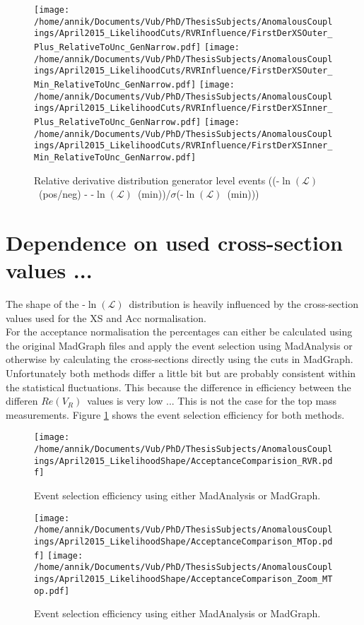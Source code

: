 \documentclass[a4paper,10pt]{article}
\newcommand{\NegLL}{-$\ln(\mathcal{L})$~}
\newcommand{\RVR}{$Re(V_R)$~}
\begin{document}
\begin{figure}[h!t]
 \centering
 \texttt{[image: /home/annik/Documents/Vub/PhD/ThesisSubjects/AnomalousCouplings/April2015\_LikelihoodCuts/RVRInfluence/FirstDerXSOuter\_Plus\_RelativeToUnc\_GenNarrow.pdf]}
 \texttt{[image: /home/annik/Documents/Vub/PhD/ThesisSubjects/AnomalousCouplings/April2015\_LikelihoodCuts/RVRInfluence/FirstDerXSOuter\_Min\_RelativeToUnc\_GenNarrow.pdf]}
 \texttt{[image: /home/annik/Documents/Vub/PhD/ThesisSubjects/AnomalousCouplings/April2015\_LikelihoodCuts/RVRInfluence/FirstDerXSInner\_Plus\_RelativeToUnc\_GenNarrow.pdf]}
 \texttt{[image: /home/annik/Documents/Vub/PhD/ThesisSubjects/AnomalousCouplings/April2015\_LikelihoodCuts/RVRInfluence/FirstDerXSInner\_Min\_RelativeToUnc\_GenNarrow.pdf]}
 \caption{Relative derivative distribution generator level events ((\NegLL(pos/neg) - \NegLL(min))/$\sigma$(\NegLL(min)))}
\end{figure}

\section{Dependence on used cross-section values ...}

The shape of the \NegLL distribution is heavily influenced by the cross-section values used for the XS and Acc normalisation.\\
For the acceptance normalisation the percentages can either be calculated using the original MadGraph files and apply the event selection using MadAnalysis or otherwise by calculating the cross-sections directly using the cuts in MadGraph.\\
Unfortunately both methods differ a little bit but are probably consistent within the statistical fluctuations. This because the difference in efficiency between the differen \RVR values is very low ... This is not the case for the top mass measurements.
Figure \ref{fig::AccComp} shows the event selection efficiency for both methods.

\begin{figure}[h!t]
 \centering
 \texttt{[image: /home/annik/Documents/Vub/PhD/ThesisSubjects/AnomalousCouplings/April2015\_LikelihoodShape/AcceptanceComparision\_RVR.pdf]}
\caption{Event selection efficiency using either MadAnalysis or MadGraph.} \label{fig::AccComp}
\end{figure}

\begin{figure}[h!t]
 \centering
 \texttt{[image: /home/annik/Documents/Vub/PhD/ThesisSubjects/AnomalousCouplings/April2015\_LikelihoodShape/AcceptanceComparison\_MTop.pdf]}
  \texttt{[image: /home/annik/Documents/Vub/PhD/ThesisSubjects/AnomalousCouplings/April2015\_LikelihoodShape/AcceptanceComparison\_Zoom\_MTop.pdf]}
\caption{Event selection efficiency using either MadAnalysis or MadGraph.} \label{fig::AccCompMTop}
\end{figure}
\end{document}
